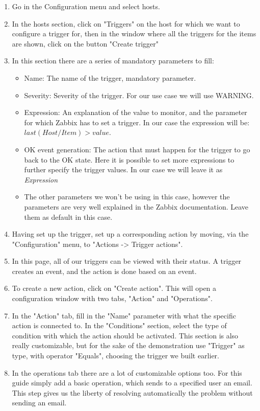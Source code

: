 \documentclass[a4paper,11pt]{scrartcl}
\begin{document}
\begin{enumerate}
    \item Go in the Configuration menu and select hosts.
    \item In the hosts section, click on "Triggers" on the host for which we want to configure a trigger for, then in the window where all the triggers for the items are shown, click on the button "Create trigger"
    \item In this section there are a series of mandatory parameters to fill:
    \begin{itemize}
        \item Name: The name of the trigger, mandatory parameter.
        \item Severity: Severity of the trigger. For our use case we will use WARNING.
        \item Expression: An explanation of the value to monitor, and the parameter for which Zabbix has to set a trigger. In our case the expression will be: $last(Host/Item)>value$. 
        \item OK event generation: The action that must happen for the trigger to go back to the OK state. Here it is possible to set more expressions to further specify the trigger values. In our case we will leave it as \textit{Expression}
        \item The other parameters we won't be using in this case, however the parameters are very well explained in the Zabbix documentation. Leave them as default in this case.
    \end{itemize}
    \item Having set up the trigger, set up a corresponding action by moving, via the "Configuration" menu, to "Actions -> Trigger actions".
    \item In this page, all of our triggers can be viewed with their status. A trigger creates an event, and the action is done based on an event.
    \item To create a new action, click on "Create action". This will open a configuration window with two tabs, "Action" and "Operations".
    \item In the "Action" tab, fill in the "Name" parameter with what the specific action is connected to. In the "Conditions" section, select the type of condition with which the action should be activated. This section is also really customizable, but for the sake of the demonstration use "Trigger" as type, with operator "Equals", choosing the trigger we built earlier.
    \item In the operations tab there are a lot of customizable options too. For this guide simply add a basic operation, which sends to a specified user an email. This step gives us the liberty of resolving automatically the problem without sending an email.

\end{enumerate}
\end{document}
